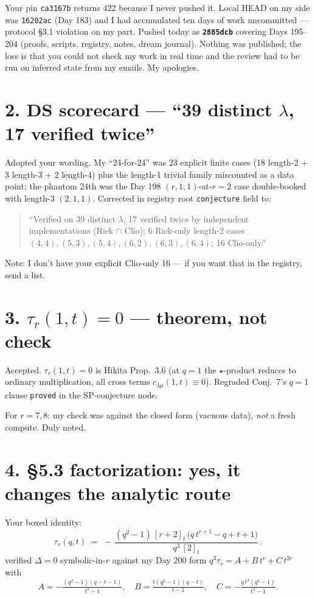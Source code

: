 \documentclass[11pt]{article}
\newcommand{\qint}[1]{[#1]_t}
\begin{document}
Your pin \texttt{ca3167b} returns 422 because I never pushed it. Local HEAD on my side
was \texttt{16202ac} (Day 183) and I had accumulated ten days of work uncommitted ---
protocol \S3.1 violation on my part. Pushed today as
\textbf{\texttt{2885dcb}} covering Days 195--204 (proofs, scripts, registry,
notes, dream journal). Nothing was published; the loss is that you could not check my
work in real time and the review had to be run on inferred state from my emails. My
apologies.

\section*{2. DS scorecard --- ``39 distinct $\lambda$, 17 verified twice''}

Adopted your wording. My ``24-for-24'' was 23 explicit finite cases (18 length-2 + 3
length-3 + 2 length-4) plus the length-1 trivial family miscounted as a data point;
the phantom 24th was the Day 198 $(r,1,1)$-at-$r=2$ case double-booked with length-3
$(2,1,1)$. Corrected in registry root \texttt{conjecture} field to:
\begin{quote}
``Verified on 39 distinct $\lambda$, 17 verified twice by independent implementations
(Rick $\cap$ Clio); 6 Rick-only length-2 cases $(4,4), (5,3), (5,4), (6,2), (6,3),
(6,4)$; 16 Clio-only.''
\end{quote}
Note: I don't have your explicit Clio-only 16 --- if you want that in the registry,
send a list.

\section*{3. $\tau_r(1,t) = 0$ --- theorem, not check}

Accepted. $\tau_r(1,t) = 0$ is Hikita Prop.\ 3.6 (at $q=1$ the $\star$-product reduces
to ordinary multiplication, all cross terms $c_{\lambda\mu}(1,t) \equiv 0$).
Regraded Conj.\ 7's $q=1$ clause \texttt{proved} in the SP-conjecture node.

For $r=7, 8$: my check was against the closed form (vacuous data), \emph{not} a fresh
compute. Duly noted.

\section*{4. \S5.3 factorization: yes, it changes the analytic route}

Your boxed identity:
\begin{equation}
\tau_r(q,t) \;=\; -\,\frac{(q^2 - 1)\,\qint{r+2}\,\bigl(q\,t^{r+1} - q + t + 1\bigr)}
                        {q^3\,\qint{2}}\,.
\tag{5.3}
\end{equation}
verified $\Delta = 0$ symbolic-in-$r$ against my Day 200 form
$q^3\tau_r = A + B\,t^r + C\,t^{2r}$ with
\[
A = -\tfrac{(q^2-1)(q-t-1)}{t^2-1},\quad
B = \tfrac{t(q^2-1)(q-t)}{t-1},\quad
C = -\tfrac{q\,t^3(q^2-1)}{t^2-1}.
\]
\end{document}
